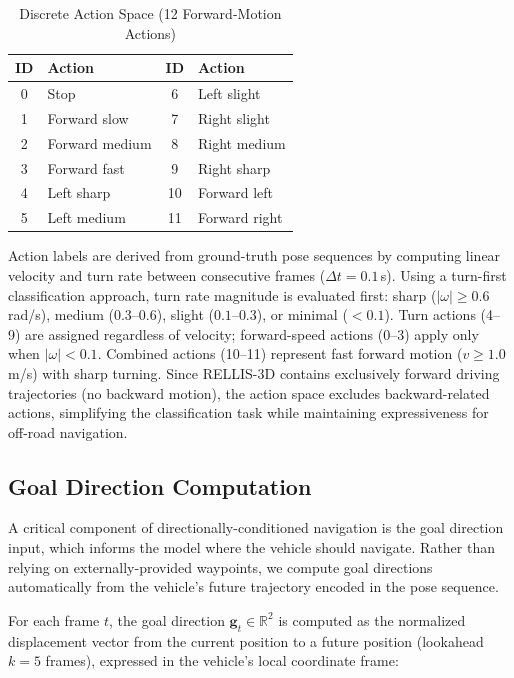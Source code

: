 \documentclass[sensors,article,submit,pdftex,moreauthors]{Definitions/mdpi}
\begin{document}
\begin{table}[h]
\caption{Discrete Action Space (12 Forward-Motion Actions)}
\label{tab:action_space}
\centering
\begin{tabular}{clcl}
\toprule
ID & Action & ID & Action \\
\midrule
0 & Stop & 6 & Left slight \\
1 & Forward slow & 7 & Right slight \\
2 & Forward medium & 8 & Right medium \\
3 & Forward fast & 9 & Right sharp \\
4 & Left sharp & 10 & Forward left \\
5 & Left medium & 11 & Forward right \\
\bottomrule
\end{tabular}
\end{table}

Action labels are derived from ground-truth pose sequences by computing linear velocity and turn rate between consecutive frames ($\Delta t = 0.1$\,s). Using a turn-first classification approach, turn rate magnitude is evaluated first: sharp ($|\omega| \geq 0.6$ rad/s), medium ($0.3$--$0.6$), slight ($0.1$--$0.3$), or minimal ($< 0.1$). Turn actions (4--9) are assigned regardless of velocity; forward-speed actions (0--3) apply only when $|\omega| < 0.1$. Combined actions (10--11) represent fast forward motion ($v \geq 1.0$ m/s) with sharp turning. Since RELLIS-3D contains exclusively forward driving trajectories (no backward motion), the action space excludes backward-related actions, simplifying the classification task while maintaining expressiveness for off-road navigation.

\subsection{Goal Direction Computation}
\label{sec:goal_direction}

A critical component of directionally-conditioned navigation is the goal direction input, which informs the model where the vehicle should navigate. Rather than relying on externally-provided waypoints, we compute goal directions automatically from the vehicle's future trajectory encoded in the pose sequence.

For each frame $t$, the goal direction $\mathbf{g}_t \in \mathbb{R}^2$ is computed as the normalized displacement vector from the current position to a future position (lookahead $k=5$ frames), expressed in the vehicle's local coordinate frame:
\end{document}

